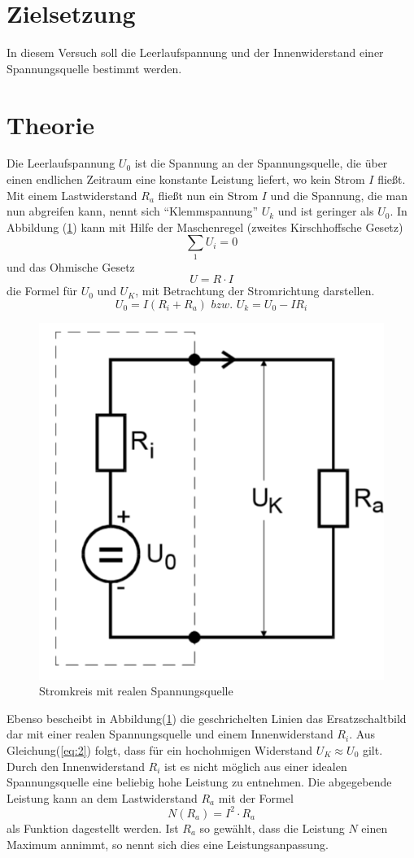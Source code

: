 \section{Zielsetzung}
In diesem Versuch soll die Leerlaufspannung und der Innenwiderstand einer Spannungsquelle
bestimmt werden.

\section{Theorie}
Die Leerlaufspannung $U_0$ ist die Spannung an der Spannungsquelle, die über einen endlichen Zeitraum eine konstante
Leistung liefert, wo kein Strom $I$ fließt.
Mit einem Lastwiderstand $R_a$ fließt nun ein Strom $I$ und die Spannung, die man nun abgreifen kann,
nennt sich \enquote{Klemmspannung} $U_k$ und ist geringer als $U_0$.
In Abbildung (\ref{abb:1}) kann mit Hilfe der Maschenregel (zweites Kirschhoffsche Gesetz)
\begin{equation*}
  \sum_1 U_i = 0
\end{equation*}
und das Ohmische Gesetz
\begin{equation}
  U = R \cdot I
  \label{eq:1}
\end{equation}
die Formel für $U_0$ und $U_K$, mit Betrachtung der Stromrichtung darstellen.
\begin{equation}
  U_0= I (R_i + R_a) \,\, bzw. \,\, U_k=U_0 - I R_i
  \label{eq:2}
\end{equation}
\begin{figure}[H]
  \centering
  \includegraphics[width=10 cm, height= 7 cm]{Bild1.png}
  \caption{Stromkreis mit realen Spannungsquelle \cite{1}}
  \label{abb:1}
\end{figure}
Ebenso bescheibt in Abbildung(\ref{abb:1}) die geschrichelten Linien das Ersatzschaltbild dar
mit einer realen Spannungsquelle und einem Innenwiderstand $R_i$.
Aus Gleichung(\ref{eq:2}) folgt, dass für ein hochohmigen Widerstand $U_K \approx U_0$ gilt.\\
Durch den Innenwiderstand $R_i$  ist es nicht möglich aus einer idealen Spannungsquelle eine beliebig
hohe Leistung zu entnehmen. Die abgegebende Leistung kann an dem Lastwiderstand $R_a$ mit der Formel
\begin{equation}
  N(R_a) = I^2 \cdot R_a
  \label{eq:3}
\end{equation}
als Funktion dagestellt werden. Ist $R_a$ so gewählt, dass die Leistung $N$ einen Maximum annimmt, so nennt sich dies
eine Leistungsanpassung.
